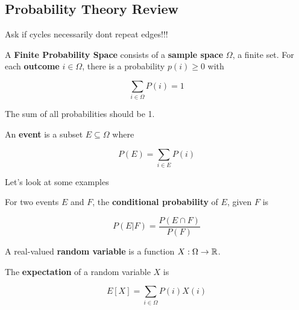 \documentclass[12pt]{article}
\begin{document}
  \subsection{Probability Theory Review}

  \QUESTION{} Ask if cycles necessarily dont repeat edges!!!

  \Definition {}
  {
    A {\bf Finite Probability Space} consists of a {\bf sample space} $\Omega$,
    a finite set. For each {\bf outcome} $i \in \Omega$, there is a probability
    $p(i) \ge 0$ with

    \[
      \sum_{i \in \Omega} P(i) = 1
    \]

    The sum of all probabilities should be 1.

    An {\bf event} is a subset $E \subseteq \Omega$ where

    \[
      P(E) = \sum_{i \in E} P(i)
    \]
  }

  Let's look at some examples



  {
    For two events $E$ and $F$, the {\bf conditional probability} of $E$, given
    $F$ is

    \[
      P(E | F) = \frac{P(E \cap F)}{P(F)}
    \]
  }


  {
    A real-valued {\bf random variable} is a function $X: \Omega \to {\mathbb R}$.
  }


  {
    The {\bf expectation} of a random variable $X$ is 

    \[
      E[X] = \sum_{i \in \Omega} P(i) X(i)
    \]
  }

\end{document}
